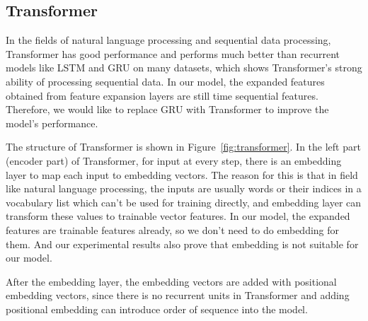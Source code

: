 \documentclass{article}
\begin{document}

\subsection{Transformer}
\hspace{16}In the fields of natural language processing and sequential data processing, Transformer has good performance and performs much better than recurrent models like LSTM and GRU on many datasets, which shows Transformer's strong ability of processing sequential data.\cite{transformer}\cite{transformer_better1}\cite{transformer_better2} In our model, the expanded features obtained from feature expansion layers are still time sequential features. Therefore, we would like to replace GRU with Transformer to improve the model's performance.

\hspace{16}The structure of Transformer is shown in Figure~\ref{fig:transformer}.\cite{transformer} In the left part (encoder part) of Transformer, for input at every step, there is an embedding layer to map each input to embedding vectors. The reason for this is that in field like natural language processing, the inputs are usually words or their indices in a vocabulary list which can't be used for training directly, and embedding layer can transform these values to trainable vector features. In our model, the expanded features are trainable features already, so we don't need to do embedding for them. And our experimental results also prove that embedding is not suitable for our model.

\hspace{16}After the embedding layer, the embedding vectors are added with positional embedding vectors, since there is no recurrent units in Transformer and adding positional embedding can introduce order of sequence into the model. 

\end{document}
